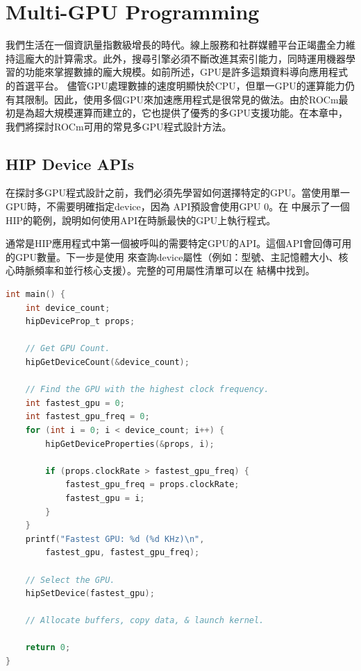 \chapter{Multi-GPU Programming}


我們生活在一個資訊量指數級增長的時代。線上服務和社群媒體平台正竭盡全力維持這龐大的計算需求。此外，搜尋引擎必須不斷改進其索引能力，同時運用機器學習的功能來掌握數據的龐大規模。如前所述，GPU是許多這類資料導向應用程式的首選平台。
儘管GPU處理數據的速度明顯快於CPU，但單一GPU的運算能力仍有其限制。因此，使用多個GPU來加速應用程式是很常見的做法。由於ROCm最初是為超大規模運算而建立的，它也提供了優秀的多GPU支援功能。在本章中，我們將探討ROCm可用的常見多GPU程式設計方法。 

\section{HIP Device APIs}

在探討多GPU程式設計之前，我們必須先學習如何選擇特定的GPU。當使用單一GPU時，不需要明確指定device，因為 API預設會使用GPU 0。在 中展示了一個HIP的範例，說明如何使用API在時脈最快的GPU上執行程式。

 通常是HIP應用程式中第一個被呼叫的需要特定GPU的API。這個API會回傳可用的GPU數量。下一步是使用 來查詢device屬性（例如：型號、主記憶體大小、核心時脈頻率和並行核心支援）。完整的可用屬性清單可以在 結構中找到。

\begin{lstlisting}[language=C, caption={用時脈最快的GPU執行程式}, captionpos=t, label={lst:hip_device_example}]
int main() {
    int device_count;
    hipDeviceProp_t props;

    // Get GPU Count.
    hipGetDeviceCount(&device_count);

    // Find the GPU with the highest clock frequency.
    int fastest_gpu = 0;
    int fastest_gpu_freq = 0;
    for (int i = 0; i < device_count; i++) {
        hipGetDeviceProperties(&props, i);

        if (props.clockRate > fastest_gpu_freq) {
            fastest_gpu_freq = props.clockRate;
            fastest_gpu = i;
        }
    }
    printf("Fastest GPU: %d (%d KHz)\n",
        fastest_gpu, fastest_gpu_freq);

    // Select the GPU.
    hipSetDevice(fastest_gpu);

    // Allocate buffers, copy data, & launch kernel.

    return 0;
}
\end{lstlisting}

